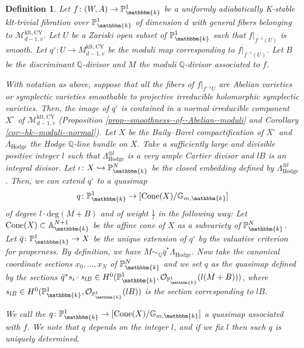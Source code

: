 \documentclass[10pt,a4paper]{amsart}
\newtheorem{defn}{Definition}
\begin{document}
\begin{defn}\label{defn--associated--quasi--map--structure}
    Let $f\colon (W,A)\to\mathbb{P}_{\mathbbm{k}}^{1}$ be a uniformly adiabatically K-stable klt-trivial fibration over $\mathbb{P}_{\mathbbm{k}}^{1}$ of dimension $d$ with general fibers belonging to $\mathcal{M}_{d-1,v}^{\mathrm{klt},\mathrm{CY}}$.
    Let $U$ be a Zariski open subset of $\mathbb{P}_{\mathbbm{k}}^{1}$ such that $f|_{f^{-1}(U)}$ is smooth.
    Let $q^\circ\colon U\to M_{d-1,v}^{\mathrm{klt},\mathrm{CY}}$ be the moduli map corresponding to $f|_{f^{-1}(U)}$. 
    Let $B$ be the discriminant $\mathbb{Q}$-divisor and $M$ the moduli $\mathbb{Q}$-divisor associated to $f$.

    With notation as above, suppose that all the fibers of $f|_{f^{-1}U}$ are Abelian varieties or symplectic varieties smoothable to projective irreducible holomorphic symplectic varieties.
    Then, the image of $q^\circ$ is contained in a normal irreducible component $X^\circ$ of $\mathcal{M}_{d-1,v}^{\mathrm{klt},\mathrm{CY}}$ (Proposition \ref{prop--smoothness--of--Abelian--moduli} and Corollary \ref{cor--hk--moduli--normal}).
    Let $X$ be the Baily--Borel compactification of $X^\circ$ and $\Lambda_{\mathrm{Hodge}}$ the Hodge $\mathbb{Q}$-line bundle on $X$.
Take a sufficiently large and divisible positive integer $l$ such that $\Lambda_{\mathrm{Hodge}}^{\otimes l}$ is a very ample Cartier divisor and $lB$ is an integral divisor.    
Let $\iota\colon X\hookrightarrow \mathbb{P}_{\mathbbm{k}}^N$ be the closed embedding defined by $\Lambda_{\mathrm{Hodge}}^{\otimes l}$.
Then, we can extend $q^\circ$ to a quasimap 
$$q\colon \mathbb{P}_{\mathbbm{k}}^{1} \to [\mathrm{Cone}(X)/\mathbb{G}_{m, \mathbbm{k}}]$$
 of degree $l\cdot\mathrm{deg}(M+B)$ and of weight $\frac{1}{l}$ in the following way: 
Let $\mathrm{Cone}(X)\subset\mathbb{A}_{\mathbbm{k}}^{N+1}$ be the affine cone of $X$ as a subvariety of $\mathbb{P}_{\mathbbm{k}}^N$.
Let $\bar{q}\colon \mathbb{P}_{\mathbbm{k}}^1\to X$ be the unique extension of $q^{\circ}$ by the valuative criterion for properness.
By definition, we have $M\sim_{\mathbb{Q}}\bar{q}^*\Lambda_{\mathrm{Hodge}}$. 
Now take the canonical coordinate sections $x_0,\ldots,x_N$ of $\mathbb{P}^N_{\mathbbm{k}}$ and we set $q$ as the quasimap defined by the sections $\bar{q}^*s_i\cdot s_{lB}\in H^0(\mathbb{P}_{\mathbbm{k}}^{1},\mathcal{O}_{\mathbb{P}_{\mathbbm{k}}^{1}}(l(M+B)))$, where $s_{lB}\in H^0(\mathbb{P}_{\mathbbm{k}}^{1},\mathcal{O}_{\mathbb{P}_{\mathbbm{k}}^{1}}(lB))$ is the section corresponding to $lB$. 

We call the $q\colon \mathbb{P}_{\mathbbm{k}}^{1} \to [\mathrm{Cone}(X)/\mathbb{G}_{m, \mathbbm{k}}]$ a {\it quasimap associated with} $f$.
We note that $q$ depends on the integer $l$, and if we fix $l$ then such $q$ is uniquely determined.
\end{defn}
\end{document}
